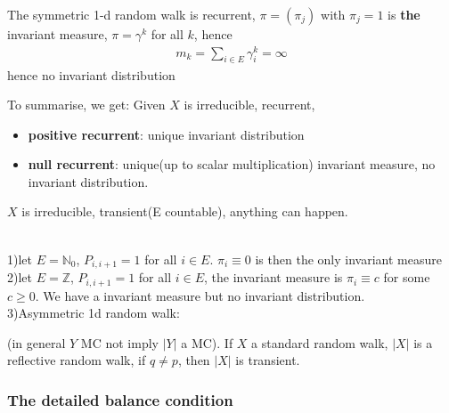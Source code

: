 \begin{example}
The symmetric 1-d random walk is recurrent, $\pi = (\pi_j)$ with $\pi_j = 1$ is \textbf{the} invariant measure, $\pi = \gamma^k$ for all $k$, hence
\begin{align*}
	m_k = \sum_{i \in E} \gamma_i^k = \infty
\end{align*}	
hence no invariant distribution
\end{example}

\begin{remark}
To summarise, we get: Given $X$ is irreducible, recurrent, 
\begin{itemize}
	\item \textbf{positive recurrent}: unique invariant distribution
	\item \textbf{null recurrent}: unique(up to scalar multiplication) invariant measure, no invariant distribution.
\end{itemize}	
$X$ is irreducible, transient(E countable), anything can happen.
\end{remark}

\begin{example}\quad\\
1)let $E = \mathbb{N}_0$, $P_{i, i+1} = 1$ for all $ i \in E$. $\pi_i 
\equiv 0$ is then the only invariant measure\\
2)let $E = \mathbb{Z}$, $P_{i, i+1} = 1$ for all $i \in E$, the invariant measure is $\pi_i \equiv c$ for some $c \ge 0$. We have a invariant measure but no invariant distribution. 	\\
3)Asymmetric 1d random walk:

\end{example}

\begin{example}
(in general $Y$ MC not imply $|Y|$ a MC). If $X$ a standard random walk, $|X|$ is a reflective random walk, if $q \neq p$, then $|X|$ is transient.
\end{example}

\begin{example}[M/G/1 queue]
	
\end{example}


\subsubsection*{The detailed balance condition}

